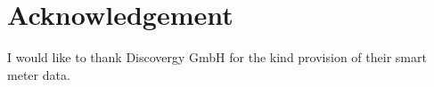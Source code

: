 \section*{Acknowledgement}

I would like to thank Discovergy GmbH for the kind provision of their smart meter data.

